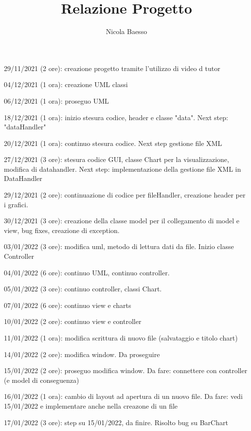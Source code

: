 \documentclass[10pt]{article}
\author{Nicola Baesso}
\title{Relazione Progetto}
\begin{document}
	\setlength{\baselineskip}{13 pt}
	
	\maketitle
	
	
	29/11/2021 (2 ore): creazione progetto tramite l'utilizzo di video d tutor
	
	04/12/2021 (1 ora): creazione UML classi
	
	06/12/2021 (1 ora): proseguo UML
	
	18/12/2021 (1 ora): inizio stesura codice, header e classe "data". Next step: "dataHandler"
	
	20/12/2021 (1 ora): continuo stesura codice. Next step gestione file XML
	
	27/12/2021 (3 ore): stesura codice GUI, classe Chart per la visualizzazione, modifica di datahandler. Next step: implementazione della gestione file XML in DataHandler
	
	29/12/2021 (2 ore): continuazione di codice per fileHandler, creazione header per i grafici.
     
    30/12/2021 (3 ore): creazione della classe model per il collegamento di model e view, bug fixes, creazione di exception.
    
    03/01/2022 (3 ore): modifica uml, metodo di lettura dati da file. Inizio classe Controller
    
    04/01/2022 (6 ore): continuo UML, continuo controller.
    
    05/01/2022 (3 ore): continuo controller, classi Chart.
    
    07/01/2022 (6 ore): continuo view e charts
    
    10/01/2022 (2 ore): continuo view e controller
    
    11/01/2022 (1 ora): modifica scrittura di nuovo file (salvataggio e titolo chart)
    
    14/01/2022 (2 ore): modifica window. Da proseguire
    
    15/01/2022 (2 ore): proseguo modifica window. Da fare: connettere con controller (e model di conseguenza)
    
    16/01/2022 (1 ora): cambio di layout ad apertura di un nuovo file. Da fare: vedi 15/01/2022 e implementare anche nella creazone di un file
    
    17/01/2022 (3 ore): step su 15/01/2022, da finire. Risolto bug su BarChart
    
\end{document}
